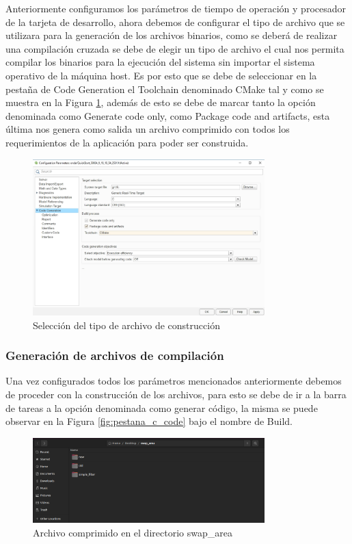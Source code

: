 Anteriormente configuramos los parámetros de tiempo de operación y procesador de la tarjeta de desarrollo, ahora debemos de configurar el tipo de archivo que se utilizara para la generación de los archivos binarios, como se deberá de realizar una compilación cruzada se debe de elegir un tipo de archivo el cual nos permita compilar los binarios para la ejecución del sistema sin importar el sistema operativo de la máquina host. Es por esto que se debe de seleccionar en la pestaña de Code Generation el Toolchain denominado CMake tal y como se muestra en la Figura \ref{fig:pestana_config_output_file}, además de esto se debe de marcar tanto la opción denominada como Generate code only, como Package code and artifacts, esta última nos genera como salida un archivo comprimido con todos los requerimientos de la aplicación para poder ser construida.


\begin{figure}[h!]
    \centering
    \includegraphics[width=0.8\textwidth]{fig/especifico_2/paso_a_paso_mtmt/configuration_output_file.png}
    \caption{Selección del tipo de archivo de construcción}
    \label{fig:pestana_config_output_file}
\end{figure}

\subsubsection{Generación de archivos de compilación}

Una vez configurados todos los parámetros mencionados anteriormente debemos de proceder con la construcción de los archivos, para esto se debe de ir a la barra de tareas a la opción denominada como generar código, la misma se puede observar en la Figura \ref{fig:pestana_c_code} bajo el nombre de Build.

\begin{figure}[h!]
    \centering
    \includegraphics[width=0.8\textwidth]{fig/especifico_2/paso_a_paso_mtmt/root_folder.png}
    \caption{Archivo comprimido en el directorio swap\_area}
    \label{fig:pestana_swap_area}
\end{figure}

